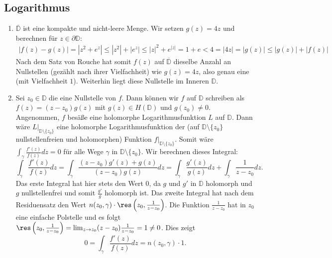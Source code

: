 \documentclass[a4paper]{article}
\begin{document}
\makeexheader


\subsection{Logarithmus}

\begin{enumerate}
    \item $\overline{\mathds{D}}$ ist eine kompakte und nicht-leere Menge.
    Wir setzen $g(z) = 4z$ und berechnen für $z \in \partial \mathds{D}$:
    \begin{align*}
        |f(z) - g(z)| = |z^2 + e^z| \leq |z^2| + |e^z| \leq |z|^2 + e^{|z|} = 1 + e < 4 = |4z| = |g(z)| \leq |g(z)| + |f(z)|
    \end{align*}
    Nach dem Satz von Rouche hat somit $f(z)$ auf $\overline{\mathds{D}}$ dieselbe Anzahl an Nullstellen (gezählt nach ihrer Vielfachheit) wie $g(z) = 4z$, also genau eine (mit Vielfachheit $1$).
    Weiterhin liegt diese Nullstelle im Inneren $\mathds{D}$.
    \item Sei $z_0 \in \mathds{D}$ die eine Nullstelle von $f$.
    Dann können wir $f$ auf $\mathds{D}$ schreiben als $f(z) = (z - z_0) g(z)$ mit $g(z) \in H(\mathds{D})$ und $g(z_0) \neq 0$.
    Angenommen, $f$ besäße eine holomorphe Logarithmusfunktion $L$ auf $\mathds{D}$.
    Dann wäre $L|_{\mathds{D}\setminus\{z_0\}}$ eine holomorphe Logarithmusfunktion der (auf $\mathds{D} \setminus \{z_0\}$ nullstellenfreien und holomorphen) Funktion $f|_{\mathds{D} \setminus \{z_0\}}$.
    Somit wäre $\int_\gamma \frac{f'(z)}{f(z)} dz = 0$ für alle Wege $\gamma$ in $\mathds{D} \setminus \{z_0\}$.
    Wir berechnen dieses Integral:
    \begin{equation*}
        \int_\gamma \frac{f'(z)}{f(z)} dz = \int_\gamma \frac{(z-z_0) g'(z) + g(z)}{(z-z_0) g(z)} dz = \int_\gamma \frac{g'(z)}{g(z)} dz + \int_\gamma \frac{1}{z - z_0} dz\text{.}
    \end{equation*}
    Das erste Integral hat hier stets den Wert $0$, da $g$ und $g'$ in $\mathds{D}$ holomorph und $g$ nullstellenfrei und somit $\frac{g'}{g}$ holomorph ist.
    Das zweite Integral hat nach dem Residuensatz den Wert $n(z_0, \gamma) \cdot \res\left(z_0, \frac{1}{z-z_0}\right)$.
    Die Funktion $\frac{1}{z-z_0}$ hat in $z_0$ eine einfache Polstelle und es folgt $\res\left(z_0, \frac{1}{z-z_0}\right) = \lim_{z \to z_0} (z-z_0) \frac{1}{z -z_0} = 1 \neq 0$.
    Dies zeigt 
    \begin{equation*}
        0 = \int_\gamma \frac{f'(z)}{f(z)} dz = n(z_0, \gamma) \cdot 1 \text{.}

\end{equation*}
\end{enumerate}
\end{document}
